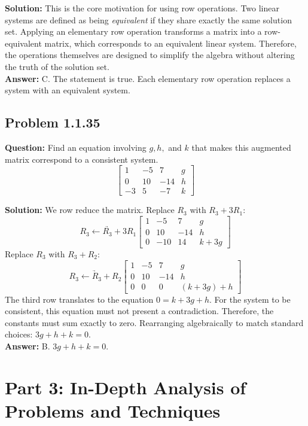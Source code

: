 \documentclass[11pt]{article}
\begin{document}
\textbf{Solution:}
This is the core motivation for using row operations. Two linear systems are defined as being \textit{equivalent} if they share exactly the same solution set. Applying an elementary row operation transforms a matrix into a row-equivalent matrix, which corresponds to an equivalent linear system. Therefore, the operations themselves are designed to simplify the algebra without altering the truth of the solution set.
\\
\textbf{Answer:} C. The statement is true. Each elementary row operation replaces a system with an equivalent system.


\subsection*{Problem 1.1.35}
\textbf{Question:} Find an equation involving $g, h,$ and $k$ that makes this augmented matrix correspond to a consistent system.
\[
\begin{bmatrix}
1 & -5 & 7 & g \\
0 & 10 & -14 & h \\
-3 & 5 & -7 & k
\end{bmatrix}
\]

\textbf{Solution:}
We row reduce the matrix.
Replace $R_3$ with $R_3 + 3R_1$:
\[
\underrightarrow{R_3 \leftarrow R_3 + 3R_1}
\begin{bmatrix}
1 & -5 & 7 & g \\
0 & 10 & -14 & h \\
0 & -10 & 14 & k + 3g
\end{bmatrix}
\]
Replace $R_3$ with $R_3 + R_2$:
\[
\underrightarrow{R_3 \leftarrow R_3 + R_2}
\begin{bmatrix}
1 & -5 & 7 & g \\
0 & 10 & -14 & h \\
0 & 0 & 0 & (k + 3g) + h
\end{bmatrix}
\]
The third row translates to the equation $0 = k + 3g + h$. 
For the system to be consistent, this equation must not present a contradiction. Therefore, the constants must sum exactly to zero.
Rearranging algebraically to match standard choices: $3g + h + k = 0$.
\\
\textbf{Answer:} B. $3g + h + k = 0$.

\newpage
\section{Part 3: In-Depth Analysis of Problems and Techniques}
\end{document}
